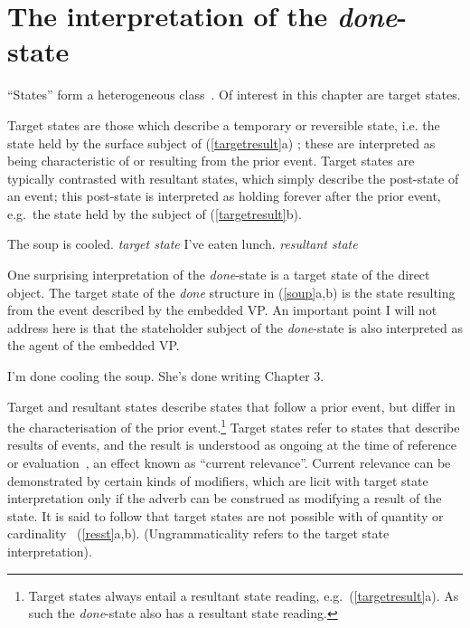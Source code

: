 \documentclass[output=paper]{langsci/langscibook}
\begin{document}
\section{The interpretation of the \emph{done}-state}\label{ssem}

\enquote{States} form a heterogeneous class~\citep[see
especially][]{Kratzer2001a}. Of interest in this chapter are target states.

Target states are those which describe a temporary or reversible state, i.e.
the state held by the surface subject of (\ref{targetresult}a)
\citep{Parsons1990a, Kratzer2001a}; these are interpreted as being
characteristic of or resulting from the prior event. Target states are
typically contrasted with resultant states, which simply describe the
post-state of an event; this post-state is interpreted as holding forever after
the prior event, e.g.\  the state held by the subject of
(\ref{targetresult}b).

\begin{exe}
\ex\label{targetresult}
\begin{xlist}
\ex The soup is cooled. \hfill \emph{target state}
\ex I've eaten lunch. \hfill \emph{resultant state}
\end{xlist}
\end{exe}

One surprising interpretation of the \emph{done}-state is a target state of the
direct object. The target state of the \emph{done} structure in (\ref{soup}a,b)
is the state resulting from the event described by the embedded VP\@. An
important point I will not address here is that the stateholder subject of the
\emph{done}-state is also interpreted as the agent of the embedded VP\@.

\begin{exe}
\ex\label{soup}
\begin{xlist}
\ex I'm done cooling the soup.
\ex She's done writing Chapter 3.
\end{xlist}
\end{exe}

Target and resultant states describe states that follow a prior event, but
differ in the characterisation of the prior event.\footnote{Target states
always entail a resultant state reading, e.g.\   (\ref{targetresult}a).  As
such the \emph{done}-state also has a resultant state reading.}  Target states
refer to states that describe results of events, and the result is understood
as ongoing at the time of reference or evaluation~\citep{Kratzer2001a}, an
effect known as \enquote{current relevance}. Current relevance can be
demonstrated by certain kinds of modifiers, which are licit with target state
interpretation only if the adverb can be construed as modifying a result of the
state. It is said to follow that target states are not possible with  of
quantity or cardinality~\citep{Mittwoch2008a} (\ref{resst}a,b).
(Ungrammaticality refers to the target state interpretation).
\end{document}
